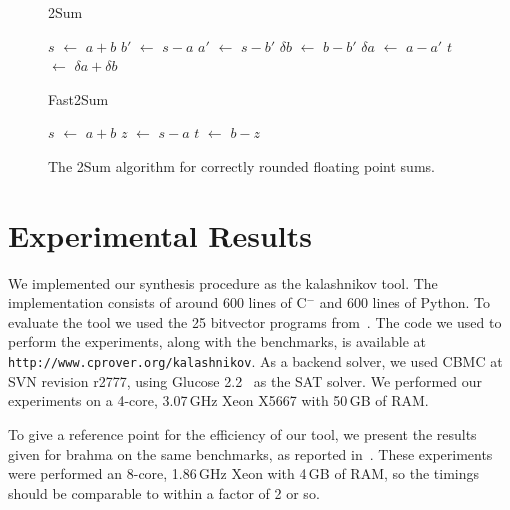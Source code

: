 \documentclass[a4paper]{llncs}
\newcommand{\newC}{C$^-$\xspace}
\newcommand*\Let[2]{\State #1 $\gets$ #2}
\begin{document}
\begin{figure}
\begin{center}
\begin{minipage}[t]{0.45\linewidth}
\begin{algorithm}[H]
\caption{\sc 2Sum
 \label{alg:2sum}}
\begin{algorithmic}
\Let{$s$}{$a+b$}
\Let{$b'$}{$s - a$}
\Let{$a'$}{$s - b'$}
\Let{$\delta b$}{$b - b'$}
\Let{$\delta a$}{$a - a'$}
\Let{$t$}{$\delta a + \delta b$}
\end{algorithmic}
\end{algorithm}
\end{minipage}
\hfill
\begin{minipage}[t]{0.45\linewidth}
\begin{algorithm}[H]
\caption{\sc Fast2Sum
 \label{alg:fast2sum}}
\begin{algorithmic}
\Let{$s$}{$a + b$}
\Let{$z$}{$s - a$}
\Let{$t$}{$b - z$}
\end{algorithmic}
\end{algorithm}
\end{minipage}
\end{center}

 
 \caption{The {\sc 2Sum} algorithm for correctly rounded floating point sums.}
  \label{fig:2sum}
\end{figure}


\section{Experimental Results}
\label{sec:experiments}
We implemented our synthesis procedure as the {\sc kalashnikov} tool.  The implementation consists
of around 600 lines of \newC and 600 lines of Python.  To evaluate the tool we used the 25 bitvector
programs from~\cite{brahma}.  The code we used to perform the experiments, along with the
benchmarks, is available at \texttt{http://www.cprover.org/kalashnikov}.  As a backend solver, we used
{\sc CBMC} at SVN revision r2777, using Glucose 2.2~\cite{glucose} as the SAT solver.
We performed our experiments on a 4-core, 3.07\,GHz Xeon X5667 with 50\,GB of RAM.

To give a reference point for the efficiency of our tool, we present the results given for {\sc brahma}
on the same benchmarks, as reported in~\cite{brahma}.  These experiments were performed an 8-core,
1.86\,GHz Xeon with 4\,GB of RAM, so the timings should be comparable to within a factor of 2 or so.
\end{document}
